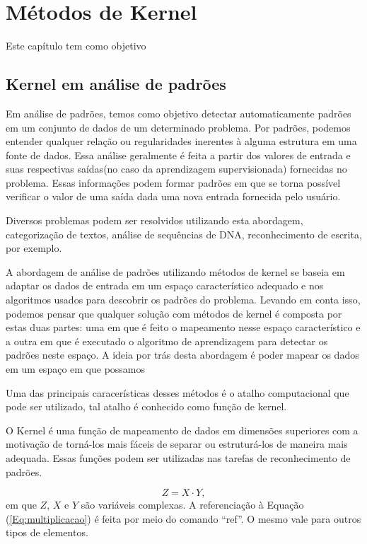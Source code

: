 \chapter{Métodos de Kernel}
\label{CAP2}


Este capítulo tem como objetivo 


\section{Kernel em análise de padrões}\label{Sub:equa}

Em análise de padrões, temos como objetivo detectar automaticamente padrões em um conjunto de dados de um determinado problema. Por padrões, podemos entender qualquer relação ou regularidades inerentes à alguma estrutura em uma fonte de dados. Essa análise geralmente é feita a partir dos valores de entrada e suas respectivas saídas(no caso da aprendizagem supervisionada) fornecidas no problema. Essas informações podem formar padrões em que se torna possível verificar o valor de uma saída dada uma nova entrada fornecida pelo usuário. 

Diversos problemas podem ser resolvidos utilizando esta abordagem, categorização de textos, análise de sequências de DNA, reconhecimento de escrita, por exemplo.

A abordagem de análise de padrões utilizando métodos de kernel se baseia em adaptar os dados de entrada em um espaço característico adequado e nos algoritmos usados para descobrir os padrões do problema. Levando em conta isso, podemos pensar que qualquer solução com métodos de kernel é composta por estas duas partes: uma em que é feito o mapeamento nesse espaço característico e a outra em que é executado o algoritmo de aprendizagem para detectar os padrões neste espaço. A ideia por trás desta abordagem é poder mapear os dados em um espaço em que possamos 

Uma das principais caracerísticas desses métodos é o atalho computacional que pode ser utilizado, tal atalho é conhecido como função de kernel.


O Kernel  é uma função de mapeamento de dados em dimensões superiores com a motivação de torná-los mais fáceis de separar ou estruturá-los de maneira mais adequada. Essas funções podem ser utilizadas nas tarefas de reconhecimento de padrões. 

\begin{equation}\label{Eq:multiplicacao}
%
Z = X \cdot Y,
%
\end{equation}
%
em que $Z$, $X$ e $Y$ são variáveis complexas. A referenciação à Equação (\ref{Eq:multiplicacao}) é feita por meio do comando ``ref''. O mesmo vale para outros tipos de elementos.

